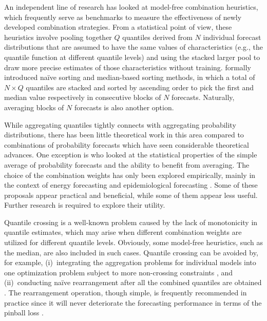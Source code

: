 \documentclass[a4paper,11pt]{article}
\begin{document}
An independent line of research has looked at model-free combination heuristics, which frequently serve as benchmarks to measure the effectiveness of newly developed combination strategies. From a statistical point of view, these heuristics involve pooling together $Q$ quantiles derived from $N$ individual forecast distributions that are assumed to have the same values of characteristics (e.g., the quantile function at different quantile levels) and using the stacked larger pool to draw more precise estimates of those characteristics without training. \citet{Wang2019-lx} formally introduced na\"{i}ve sorting and median-based sorting methods, in which a total of $N \times Q$ quantiles are stacked and sorted by ascending order to pick the first and median value respectively in consecutive blocks of $N$ forecasts. Naturally, averaging blocks of $N$ forecasts is also another option.

While aggregating quantiles tightly connects with aggregating probability distributions, there has been little theoretical work in this area compared to combinations of probability forecasts which have seen considerable theoretical advances. One exception is \citet{Lichtendahl2013-rt} who looked at the statistical properties of the simple average of probability forecasts and the ability to benefit from averaging. The choice of the combination weights has only been explored empirically, mainly in the context of energy forecasting \citep[e.g.,][]{Wang2019-lx,Browell2020-pa} and epidemiological forecasting \citep[e.g.,][]{Ray2022-co}. Some of these proposals appear practical and beneficial, while some of them appear less useful. Further research is required to explore their utility.

Quantile crossing is a well-known problem caused by the lack of monotonicity in quantile estimates, which may arise when different combination weights are utilized for different quantile levels. Obviously, some model-free heuristics, such as the median, are also included in such cases. Quantile crossing can be avoided by, for example, (i)~integrating the aggregation problems for individual models into one optimization problem subject to more non-crossing constraints \citep[e.g.,][]{Bondell2010-no,Kim2021-wa}, and (ii)~conducting na\"{i}ve rearrangement after all the combined quantiles are obtained \citep[e.g.,][]{Chernozhukov2010-zz,Berrisch2021-cr}. The rearrangement operation, though simple, is frequently recommended in practice since it will never deteriorate the forecasting performance in terms of the pinball loss \citep{Chernozhukov2010-zz}.
\end{document}
